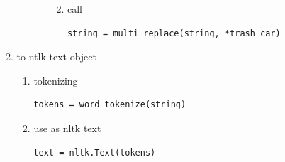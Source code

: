 \documentclass[11pt]{article}
\begin{document}
\begin{enumerate}
\begin{enumerate}
\begin{enumerate}
\begin{enumerate}
\begin{enumerate}
\begin{verbatim}
\end{verbatim}

\item call
\label{sec:orgb3fc5e5}
\begin{verbatim}
string = multi_replace(string, *trash_car)
\end{verbatim}
\end{enumerate}
\end{enumerate}
\end{enumerate}


\item to ntlk text object
\label{sec:org8a88e73}
\begin{enumerate}
\item tokenizing
\label{sec:orgab1377c}
\begin{verbatim}
tokens = word_tokenize(string)
\end{verbatim}

\item use as nltk text
\label{sec:orgd3077e0}
\begin{verbatim}
text = nltk.Text(tokens)
\end{verbatim}
\end{enumerate}
\end{enumerate}
\end{enumerate}
\end{document}
